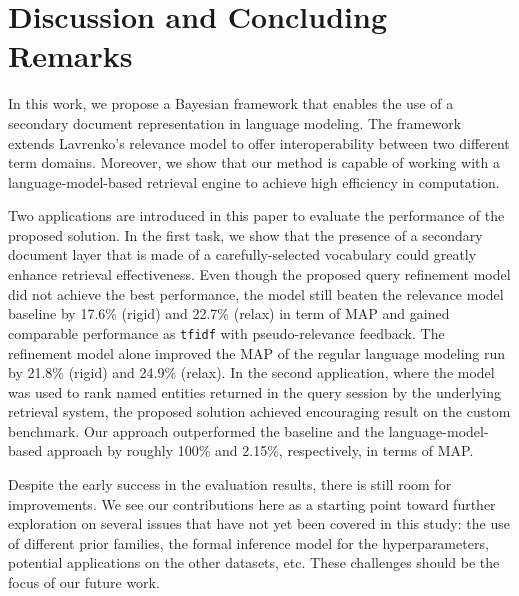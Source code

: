 \section{Discussion and Concluding Remarks}\label{s:concluding-remarks}

In this work, we propose a Bayesian framework that enables the use of a
secondary document representation in language modeling.  The framework extends
Lavrenko's relevance model to offer interoperability between two different
term domains.  Moreover, we show that our method is capable of working with a
language-model-based retrieval engine to achieve high efficiency in
computation.  

Two applications are introduced in this paper to evaluate the performance of
the proposed solution.  In the first task, we show that the presence of a
secondary document layer that is made of a carefully-selected vocabulary could
greatly enhance retrieval effectiveness.  Even though the proposed query
refinement model did not achieve the best performance, the model still beaten
the relevance model baseline by 17.6\% (rigid) and 22.7\% (relax) in term of
MAP and gained comparable performance as {\tt tfidf} with pseudo-relevance
feedback.  The refinement model alone improved the MAP of the regular language
modeling run by 21.8\% (rigid) and 24.9\% (relax).  In the second application,
where the model was used to rank named entities returned in the query session
by the underlying retrieval system, the proposed solution achieved encouraging
result on the custom benchmark.  Our approach outperformed the baseline and the language-model-based
approach by roughly 100\% and 2.15\%, respectively, in terms of MAP.

Despite the early success in the evaluation results, there is still room for
improvements.  We see our contributions here as a starting point toward further
exploration on several issues that have not yet been covered in this study: the
use of different prior families, the formal inference model for the
hyperparameters, potential applications on the other datasets, etc.  These
challenges should be the focus of our future work.


